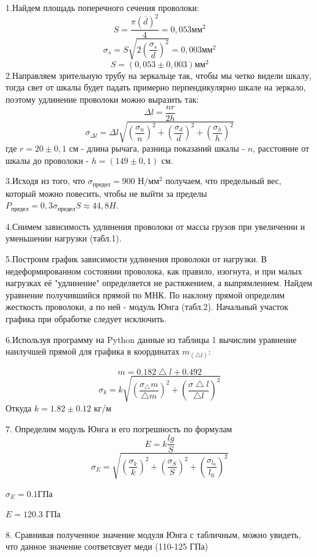 \documentclass[a4paper]{article}
\begin{document}
1.Найдем площадь поперечного сечения проволоки:
\[S = \frac{\pi (\overline{d})^2}{4} = 0,053 \text{мм}^2 \]
\[\sigma_{s} = S\sqrt{2(\frac{\sigma_{s}}{d})^2 } = 0,003 \text{мм}^2\]
\[S = (0,053\pm 0,003) \text{мм}^2\]
2.Направляем зрительную трубу на зеркальце так, чтобы мы четко видели шкалу, тогда свет от шкалы будет падать примерно перпендикулярно шкале на зеркало, поэтому удлинение проволоки можно выразить так:
\[\Delta l =\dfrac{nr}{2h}\]
\[ \sigma_{\Delta l} = \Delta l\sqrt{\left( \dfrac{\sigma_{n}}{n}\right)^2 + \left(\dfrac{\sigma_d}{d}\right)^2+\left(\dfrac{\sigma_h}{h}\right)^2} \]
где $r = 20\pm 0,1$ см - длина рычага, разница показаний шкалы - $n$, расстояние от шкалы до проволоки - $h = (149\pm0,1)\text{ см}$.\par
3.Исходя из того, что $\sigma_{\text{предел}} = 900 \text{ Н}/\text{мм}^2$ получаем, что предельный вес, который можно повесить, чтобы не выйти за пределы $P_{\text{предел}} = 0,3 \sigma_{\text{предел}} S \approx 44,8 H$.\par
4.Снимем зависимость удлинения проволоки от массы грузов при увеличении и уменьшении нагрузки  (табл.1). \par
5.Построим график зависимости удлинения проволоки от нагрузки. В недеформированном состоянии проволока, как правило, изогнута, и при малых нагрузках её "удлинение" определяется не растяжением, а выпрямлением. Найдем уравнение получившийся прямой по МНК. По наклону прямой определим жесткость проволоки, а по ней - модуль Юнга (табл.2). Начальный участок графика при обработке следует исключить.\par
6.Используя программу на Python данные из таблицы 1 вычислим уравнение наилучшей прямой для графика в координатах $m_{(\bigtriangleup l )}$:\par

\[m = 0.182\bigtriangleup l + 0.492\]
\[\sigma_k = k\sqrt{(\frac{\sigma_\bigtriangleup m}{\bigtriangleup m} )^2 + (\frac{\sigma \bigtriangleup l}{\bigtriangleup l} )^2}\] 
Откуда $k = 1.82\pm 0.12 $ кг/м\par

7. Определим модуль Юнга и его погрешность по формулам 
\[E = k\frac{lg}{S}\]
\[\sigma_E = \sqrt{\left( \dfrac{\sigma_{k}}{k} \right)^2 + \left( \dfrac{\sigma_{S}}{S} \right)^2 + \left( \dfrac{\sigma_{l_0}}{l_0} \right)^2 }\]
\begin{flushleft}
$\sigma_E = 0.1 \text{ГПа}$\par
$E = 120.3$ ГПа\par
8. Сравнивая полученное значение модуля Юнга с табличным, можно увидеть, что данное значение соответсвует меди (110-125 ГПа)
\end{flushleft}
\end{document}
